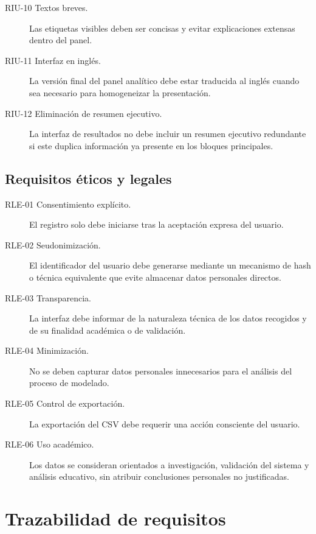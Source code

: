 \begin{description}
    \item[RIU-10 Textos breves.] Las etiquetas visibles deben ser concisas y evitar explicaciones extensas dentro del panel.

    \item[RIU-11 Interfaz en inglés.] La versión final del panel analítico debe estar traducida al inglés cuando sea necesario para homogeneizar la presentación.

    \item[RIU-12 Eliminación de resumen ejecutivo.] La interfaz de resultados no debe incluir un resumen ejecutivo redundante si este duplica información ya presente en los bloques principales.
\end{description}

\subsection{Requisitos éticos y legales}

\begin{description}
    \item[RLE-01 Consentimiento explícito.] El registro solo debe iniciarse tras la aceptación expresa del usuario.

    \item[RLE-02 Seudonimización.] El identificador del usuario debe generarse mediante un mecanismo de hash o técnica equivalente que evite almacenar datos personales directos.

    \item[RLE-03 Transparencia.] La interfaz debe informar de la naturaleza técnica de los datos recogidos y de su finalidad académica o de validación.

    \item[RLE-04 Minimización.] No se deben capturar datos personales innecesarios para el análisis del proceso de modelado.

    \item[RLE-05 Control de exportación.] La exportación del CSV debe requerir una acción consciente del usuario.

    \item[RLE-06 Uso académico.] Los datos se consideran orientados a investigación, validación del sistema y análisis educativo, sin atribuir conclusiones personales no justificadas.
\end{description}

\section{Trazabilidad de requisitos}

